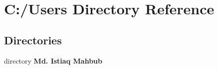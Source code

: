\section{C\+:/\+Users Directory Reference}
\label{dir_d522931ffa1371640980b621734a4381}
\subsection*{Directories}
\begin{DoxyCompactItemize}
\item 
directory \textbf{ Md. Istiaq Mahbub}
\end{DoxyCompactItemize}
